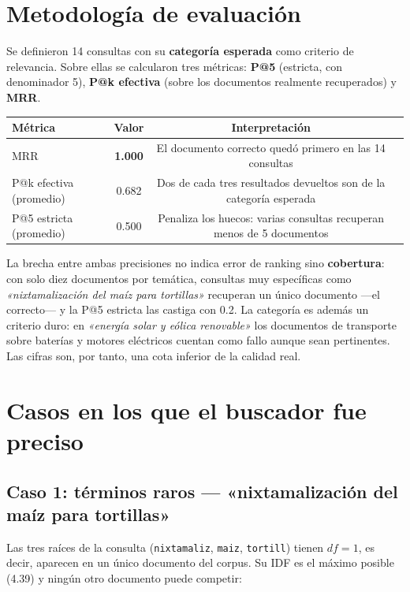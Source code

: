 \documentclass[10pt,a4paper]{article}
\newcommand{\term}[1]{\textcolor{acento}{\texttt{#1}}}
\begin{document}
\section{Metodología de evaluación}

Se definieron 14 consultas con su \textbf{categoría esperada} como criterio de relevancia. Sobre
ellas se calcularon tres métricas: \textbf{P@5} (estricta, con denominador 5), \textbf{P@k efectiva}
(sobre los documentos realmente recuperados) y \textbf{MRR}.

\begin{table}[h]
\centering\small
\begin{tabular}{lccc}
\toprule
\textbf{Métrica} & \textbf{Valor} & \textbf{Interpretación} \\
\midrule
MRR                    & \textbf{1.000} & El documento correcto quedó primero en las 14 consultas \\
P@k efectiva (promedio) & 0.682 & Dos de cada tres resultados devueltos son de la categoría esperada \\
P@5 estricta (promedio) & 0.500 & Penaliza los huecos: varias consultas recuperan menos de 5 documentos \\
\bottomrule
\end{tabular}
\end{table}

La brecha entre ambas precisiones no indica error de ranking sino \textbf{cobertura}: con solo diez
documentos por temática, consultas muy específicas como \emph{«nixtamalización del maíz para
tortillas»} recuperan un único documento —el correcto— y la P@5 estricta las castiga con 0.2. La
categoría es además un criterio duro: en \emph{«energía solar y eólica renovable»} los documentos
de transporte sobre baterías y motores eléctricos cuentan como fallo aunque sean pertinentes. Las
cifras son, por tanto, una cota inferior de la calidad real.

\section{Casos en los que el buscador fue preciso}

\subsection*{Caso 1: términos raros — «nixtamalización del maíz para tortillas»}

Las tres raíces de la consulta (\term{nixtamaliz}, \term{maiz}, \term{tortill}) tienen
$\mathit{df}=1$, es decir, aparecen en un único documento del corpus. Su IDF es el máximo posible
(4.39) y ningún otro documento puede competir:
\end{document}
